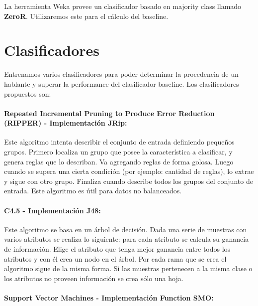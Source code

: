 La herramienta Weka provee un clasificador basado en majority class llamado \textbf{ZeroR}. Utilizaremos este para el cálculo del baseline. 

\section{Clasificadores}

Entrenamos varios clasificadores para poder determinar la procedencia de un hablante y superar la performance del clasificador baseline. Los clasificadores propuestos son: 

\paragraph{Repeated Incremental Pruning to Produce Error Reduction (RIPPER) \cite{Cohen1995} - Implementación JRip:}


Este algoritmo intenta describir el conjunto de entrada definiendo pequeños grupos. Primero localiza un grupo que posee la característica a clasificar, y genera reglas que lo describan. Va agregando reglas de forma golosa. Luego cuando se supera una cierta condición (por ejemplo: cantidad de reglas), lo extrae y sigue con otro grupo. Finaliza cuando describe todos los grupos del conjunto de entrada. Este algoritmo es útil para datos no balanceados.

\paragraph{C4.5 \cite{Quinlan1993} - Implementación J48:}


Este algoritmo se basa en un árbol de decisión. Dada una serie de muestras con varios atributos se realiza lo siguiente: para cada atributo se calcula su ganancia de información. Elige el atributo que tenga mejor ganancia entre todos los atributos y con él crea un nodo en el árbol. Por cada rama que se crea el algoritmo sigue de la misma forma. Si las muestras pertenecen a la misma clase o los atributos no proveen información se crea sólo una hoja.

\paragraph{Support Vector Machines \cite{Platt98sequentialminimal} - Implementación Function SMO:}

